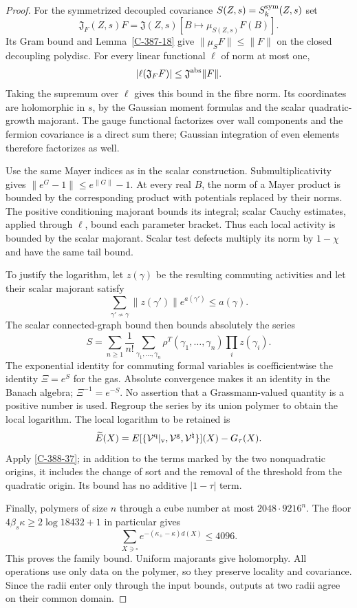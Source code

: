 \documentclass[11pt,letterpaper,reqno]{amsart}
\theoremstyle{definition}
\theoremstyle{remark}
\begin{document}
\begin{proof}
For the symmetrized decoupled covariance
$S(Z,s)=S_k^{\rm sym}(Z,s)$ set
\[
 \mathfrak J_F(Z,s)F=
 \mathfrak J(Z,s)[B\mapsto\mu_{S(Z,s)}F(B)].
\]
Its Gram bound and Lemma~\ref{C-387-18} give
$\|\mu_SF\|\le\|F\|$ on the closed decoupling polydisc.
For every linear functional $\ell$ of norm at most one,
\[
 |\ell(\mathfrak J_FF)|
 \le\mathfrak J^{\rm abs}\|F\|.
\]
Taking the supremum over $\ell$ gives this bound in the fibre
norm.  Its coordinates are holomorphic in $s$, by the Gaussian
moment formulas and the scalar quadratic-growth majorant.
The gauge functional factorizes over wall components and the
fermion covariance is a direct sum there; Gaussian integration
of even elements therefore factorizes as well.

Use the same Mayer indices as in the scalar construction.
Submultiplicativity gives
$\|e^G-1\|\le e^{\|G\|}-1$.  At every real $B$, the norm
of a Mayer product is bounded by the corresponding product
with potentials replaced by their norms.  The positive
conditioning majorant bounds its integral; scalar Cauchy
estimates, applied through $\ell$, bound each parameter
bracket.  Thus each local activity is bounded by the
scalar majorant.  Scalar test defects multiply its norm by
$1-\chi$ and have the same tail bound.

To justify the logarithm, let $z(\gamma)$ be the resulting
commuting activities and let their scalar majorant satisfy
\[
 \sum_{\gamma'\nsim\gamma}\|z(\gamma')\|e^{a(\gamma')}
                                      \le a(\gamma).
\]
The scalar connected-graph bound then bounds absolutely the
series
\[
 S=\sum_{n\ge1}\frac1{n!}\sum_{\gamma_1,\ldots,\gamma_n}
 \rho^T(\gamma_1,\ldots,\gamma_n)\prod_i z(\gamma_i).
\]
The exponential identity for commuting formal variables is
coefficientwise the identity $\Xi=e^S$ for the gas.  Absolute
convergence makes it an identity in the Banach algebra;
$\Xi^{-1}=e^{-S}$.  No assertion that a Grassmann-valued
quantity is a positive number is used.  Regroup the series
by its union polymer to obtain the local logarithm.
The local logarithm to be retained is
\[
 \widetilde E(X)=E[\{\mathcal V^{\rm q}|_{\rm v},
            \mathcal V^{\rm g},\mathcal V^\natural\}](X)-G_\tau(X).
\]
Apply \cref{C-388-37}; in addition to the terms marked by
the two nonquadratic origins, it includes the change of
sort and the removal of the threshold from the quadratic
origin.  Its bound has no additive $|1-\tau|$ term.

Finally, polymers of size $n$ through a cube number at most
$2048\cdot9216^n$.  The floor
$4\beta_s\kappa\ge2\log18432+1$ in particular gives
\[
 \sum_{X\ni\square}e^{-(\kappa_+-\kappa)d(X)}\le4096.
\]
This proves the family bound.  Uniform majorants give
holomorphy.  All operations use only data on the polymer, so
they preserve locality and covariance.  Since the radii enter
only through the input bounds, outputs at two radii agree on
their common domain.
\end{proof}
\end{document}

